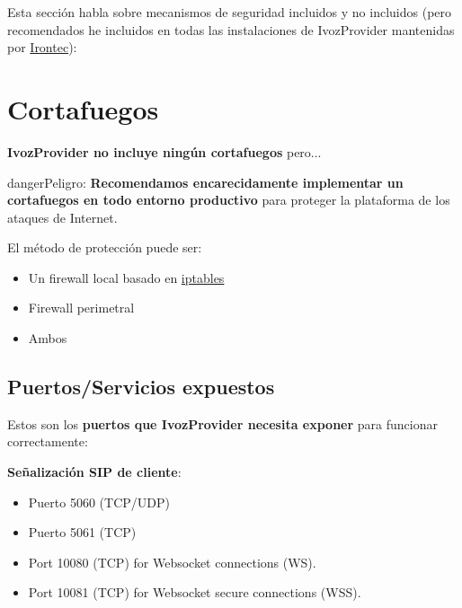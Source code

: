 \documentclass[letterpaper,10pt,spanish]{sphinxmanual}
\begin{document}
Esta sección habla sobre mecanismos de seguridad incluidos y no incluidos (pero recomendados he incluidos en todas las instalaciones de IvozProvider mantenidas por \href{https://www.irontec.com}{Irontec}):


\section{Cortafuegos}
\label{security_and_maintenance/security/firewall:firewall}\label{security_and_maintenance/security/firewall::doc}
\textbf{IvozProvider no incluye ningún cortafuegos} pero...

\begin{notice}{danger}{Peligro:}
\textbf{Recomendamos encarecidamente implementar un cortafuegos en todo entorno productivo} para proteger la plataforma de los ataques de Internet.
\end{notice}

El método de protección puede ser:
\begin{itemize}
\item {} 
Un firewall local basado en \href{https://www.netfilter.org/}{iptables}

\item {} 
Firewall perimetral

\item {} 
Ambos

\end{itemize}


\subsection{Puertos/Servicios expuestos}
\label{security_and_maintenance/security/firewall:exposed-ports-services}
Estos son los \textbf{puertos que IvozProvider necesita exponer} para funcionar correctamente:

\textbf{Señalización SIP de cliente}:
\begin{itemize}
\item {} 
Puerto 5060 (TCP/UDP)

\item {} 
Puerto 5061 (TCP)

\item {} 
Port 10080 (TCP) for Websocket connections (WS).

\item {} 
Port 10081 (TCP) for Websocket secure connections (WSS).

\end{itemize}
\end{document}
